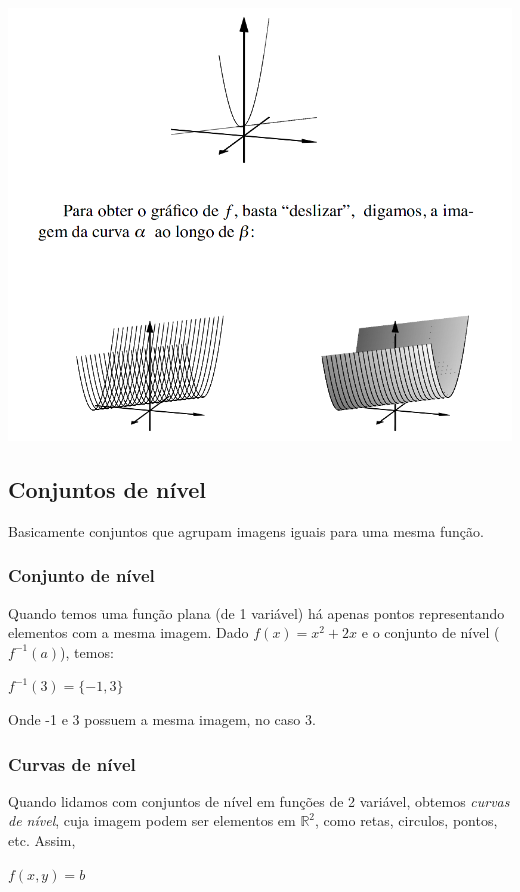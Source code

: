 \documentclass[letterpaper, 11pt]{article}
\begin{document}
\begin{center}
\includegraphics[width=.9\linewidth]{./img/esbocar2.png}
\end{center}

\subsection{Conjuntos de nível}
\label{sec:orgb47df39}
Basicamente conjuntos que agrupam imagens iguais para uma mesma função.
\subsubsection{Conjunto de nível}
\label{sec:org945d94e}
Quando temos uma função plana (de 1 variável) há apenas pontos representando elementos com a mesma imagem. Dado \(f(x) = x^2+2x\) e o conjunto de nível (\(f^{-1}(a)\)), temos:

\begin{center} $f^{-1}(3) = \{-1,3\}$ \end{center}

Onde -1 e 3 possuem a mesma imagem, no caso 3.

\subsubsection{Curvas de nível}
\label{sec:org6e83089}
Quando lidamos com conjuntos de nível em funções de 2 variável, obtemos \emph{curvas de nível}, cuja imagem podem ser elementos em \(\mathbb{R}^2\), como retas, circulos, pontos, etc. Assim,

\begin{center} $f(x,y) = b$ \end{center}
\end{document}
